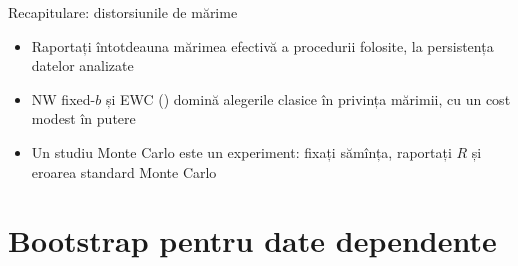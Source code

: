 \begin{frame}{Recapitulare: distorsiunile de mărime}
\itemsize{\small}
\begin{itemize}
    \item Raportați întotdeauna mărimea efectivă a procedurii folosite, la persistența datelor analizate
    \item NW fixed-$b$ și EWC () domină alegerile clasice în privința mărimii, cu un cost modest în putere
    \item Un studiu Monte Carlo este un experiment: fixați sămînța, raportați $R$ și eroarea standard Monte Carlo
\end{itemize}
\end{frame}


\section{Bootstrap pentru date dependente}

